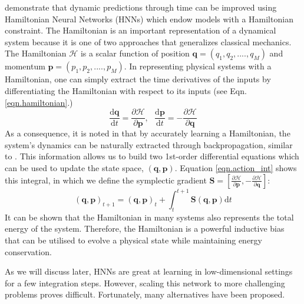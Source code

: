 \documentclass{article}
\begin{document}
\cite{greydanus_hamiltonian_2019} demonstrate that dynamic predictions through time can be improved using Hamiltonian Neural Networks (HNNs) which endow models with a Hamiltonian constraint. The Hamiltonian is an important representation of a dynamical system because it is one of two approaches that generalizes classical mechanics. The Hamiltonian $\mathcal{H}$ is a scalar function of position $\mathbf{q} = (q_1,q_2,....,q_M)$ and momentum $\mathbf{p} = (p_1,p_2,....,p_M)$. In representing physical systems with a Hamiltonian, one can simply extract the time derivatives of the inputs by differentiating the Hamiltonian with respect to its inputs (see Eqn. \ref{eqn.hamiltonian}.)
\begin{equation}
\frac{\mathrm{d}\mathbf{q}}{\mathrm{d}t} = \frac{\partial \mathcal{H}}{\partial \mathbf{p}}, ~~~
\frac{\mathrm{d}\mathbf{p}}{\mathrm{d}t} = -\frac{\partial \mathcal{H}}{\partial \mathbf{q}}
\label{eqn.hamiltonian}
\end{equation}
As a consequence, it is noted in \cite{greydanus_hamiltonian_2019} that by accurately learning a Hamiltonian, the system's dynamics can be naturally extracted through backpropagation, similar to \cite{raissi_physics-informed_2019}. This information allows us to build two 1st-order differential equations which can be used to update the state space, $(\mathbf{q},\mathbf{p})$. Equation \ref{eqn.action_int} shows this integral, in which we define the symplectic gradient $\mathbf{S}  = \left [ \frac{\partial \mathcal{H}}{\partial \mathbf{p}},-\frac{\partial \mathcal{H}}{\partial \mathbf{q}} \right ] $:
\begin{equation}
(\mathbf{q},\mathbf{p})_{t+1} = (\mathbf{q},\mathbf{p})_t + \int_t^{t+1} \mathbf{S}(\mathbf{q},\mathbf{p}) \mathrm{d}t
\label{eqn.action_int}
\end{equation}
It can be shown that the Hamiltonian in many systems also represents the total energy of the system. Therefore, the Hamiltonian is a powerful inductive bias that can be utilised to evolve a physical state while maintaining energy conservation.

As we will discuss later, HNNs are great at learning in low-dimensional settings for a few integration steps. However, scaling this network to more challenging problems proves difficult. Fortunately, many alternatives have been proposed. 
\end{document}

